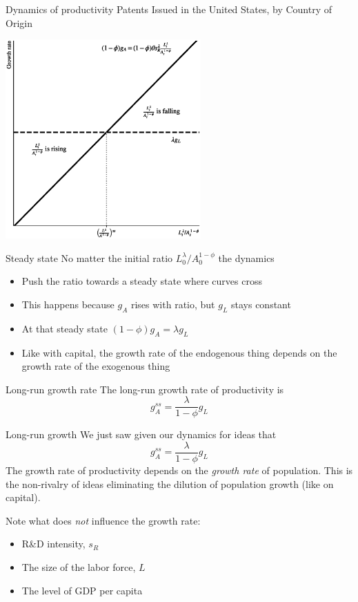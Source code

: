 \begin{frame}{Dynamics of productivity}
Patents Issued in the United States, by Country of Origin
\begin{center}
\includegraphics[height = 3in]{../Figures/fig-ch5-fig1.eps}
\end{center}
\end{frame}

\begin{frame}{Steady state}
No matter the initial ratio $L_0^{\lambda}/A_0^{1-\phi}$ the dynamics
\begin{itemize}
	\item Push the ratio towards a steady state where curves cross
	\item This happens because $g_A$ rises with ratio, but $g_L$ stays constant
	\item At that steady state $(1-\phi)g_A = \lambda g_L$
	\item Like with capital, the growth rate of the endogenous thing depends on the growth rate of the exogenous thing
\end{itemize}
\begin{block}{Long-run growth rate}
The long-run growth rate of productivity is
\begin{equation}
	g_A^{ss} = \frac{\lambda}{1-\phi}g_L
\end{equation}
\end{block}
\end{frame}

\begin{frame}{Long-run growth}
We just saw given our dynamics for ideas that
\begin{equation}
	g_A^{ss} = \frac{\lambda}{1-\phi}g_L
\end{equation}
The growth rate of productivity depends on the \textit{growth rate} of population. This is the non-rivalry of ideas eliminating the dilution of population growth (like on capital).

\vspace{.25in}\noindent Note what does \textit{not} influence the growth rate:
\begin{itemize}
	\item R\&D intensity, $s_R$
	\item The size of the labor force, $L$
	\item The level of GDP per capita
\end{itemize}
\end{frame}

